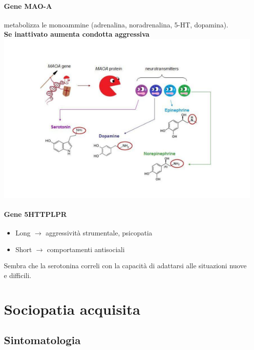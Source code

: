 \documentclass[12pt, a4paper]{article}
\begin{document}
\paragraph{Gene MAO-A} metabolizza le monoammine (adrenalina, noradrenalina, 5-HT, dopamina).\\
\textbf{Se inattivato aumenta condotta aggressiva}
\medskip\\
\includegraphics[width=\linewidth]{./images/image0}

\paragraph{Gene 5HTTPLPR} 
\begin{itemize}
    \item Long $\rightarrow$ aggressività strumentale, psicopatia
    \item Short $\rightarrow$ comportamenti antisociali
\end{itemize}

Sembra che la serotonina correli con la capacità di adattarsi alle situazioni nuove e difficili.

\section{Sociopatia acquisita}

\subsection{Sintomatologia} 
\end{document}
